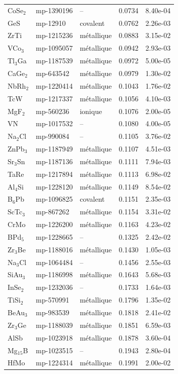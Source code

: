 \begin{longtable}{@{}l l l r r@{}}
CoSe$_{2}$ & mp-1390196 & -- & 0.0734 & 8.40e-04 \\
GeS & mp-12910 & covalent & 0.0762 & 2.26e-03 \\
ZrTi & mp-1215236 & m\'etallique & 0.0883 & 3.15e-02 \\
VCo$_{3}$ & mp-1095057 & m\'etallique & 0.0942 & 2.93e-03 \\
Tl$_{3}$Ga & mp-1187539 & m\'etallique & 0.0972 & 5.00e-05 \\
CaGe$_{2}$ & mp-643542 & m\'etallique & 0.0979 & 1.30e-02 \\
NbRh$_{2}$ & mp-1220414 & m\'etallique & 0.1043 & 1.76e-02 \\
TcW & mp-1217337 & m\'etallique & 0.1056 & 4.10e-03 \\
MgF$_{2}$ & mp-560236 & ionique & 0.1076 & 2.00e-05 \\
VN & mp-1017532 & -- & 0.1080 & 4.00e-05 \\
Na$_{2}$Cl & mp-990084 & -- & 0.1105 & 3.76e-02 \\
ZnPb$_{3}$ & mp-1187949 & m\'etallique & 0.1107 & 4.51e-03 \\
Sr$_{3}$Sn & mp-1187136 & m\'etallique & 0.1111 & 7.94e-03 \\
TaRe & mp-1217894 & m\'etallique & 0.1113 & 6.98e-02 \\
Al$_{4}$Si & mp-1228120 & m\'etallique & 0.1149 & 8.54e-02 \\
B$_{6}$Pb & mp-1096825 & covalent & 0.1151 & 2.35e-03 \\
ScTc$_{3}$ & mp-867262 & m\'etallique & 0.1154 & 3.31e-02 \\
CrMo & mp-1226200 & m\'etallique & 0.1163 & 4.23e-02 \\
BPd$_{5}$ & mp-1228665 & -- & 0.1325 & 2.42e-02 \\
Zr$_{3}$Be & mp-1188016 & m\'etallique & 0.1430 & 1.05e-03 \\
Na$_{3}$Cl & mp-1064484 & -- & 0.1456 & 2.55e-03 \\
SiAu$_{3}$ & mp-1186998 & m\'etallique & 0.1643 & 5.68e-03 \\
InSe$_{2}$ & mp-1232036 & -- & 0.1733 & 1.64e-03 \\
TiSi$_{2}$ & mp-570991 & m\'etallique & 0.1796 & 1.35e-02 \\
BeAu$_{3}$ & mp-983539 & m\'etallique & 0.1818 & 2.41e-02 \\
Zr$_{3}$Ge & mp-1188039 & m\'etallique & 0.1851 & 6.59e-03 \\
AlSb & mp-1023918 & m\'etallique & 0.1878 & 3.60e-04 \\
Mg$_{15}$B & mp-1023515 & -- & 0.1943 & 2.80e-04 \\
HfMo & mp-1224314 & m\'etallique & 0.1991 & 2.00e-02 \\
\midrule
\end{longtable}